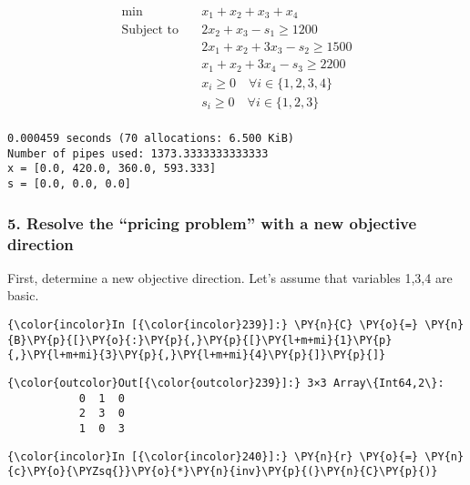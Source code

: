 \begin{equation} \begin{split}\min\quad & x_{1} + x_{2} + x_{3} + x_{4}\\
\text{Subject to} \quad & 2 x_{2} + x_{3} - s_{1} \geq 1200\\
 & 2 x_{1} + x_{2} + 3 x_{3} - s_{2} \geq 1500\\
 & x_{1} + x_{2} + 3 x_{4} - s_{3} \geq 2200\\
 & x_{i} \geq 0 \quad\forall i \in \{1,2,3,4\}\\
 & s_{i} \geq 0 \quad\forall i \in \{1,2,3\}\\
\end{split}
\end{equation}

    
    \begin{Verbatim}[commandchars=\\\{\}]
  0.000459 seconds (70 allocations: 6.500 KiB)
Number of pipes used: 1373.3333333333333
x = [0.0, 420.0, 360.0, 593.333]
s = [0.0, 0.0, 0.0]

    \end{Verbatim}

    \hypertarget{resolve-the-pricing-problem-with-a-new-objective-direction}{%
\subsubsection{5. Resolve the ``pricing problem'' with a new objective
direction}\label{resolve-the-pricing-problem-with-a-new-objective-direction}}

    First, determine a new objective direction. Let's assume that variables
1,3,4 are basic.

    \begin{Verbatim}[commandchars=\\\{\}]
{\color{incolor}In [{\color{incolor}239}]:} \PY{n}{C} \PY{o}{=} \PY{n}{B}\PY{p}{[}\PY{o}{:}\PY{p}{,}\PY{p}{[}\PY{l+m+mi}{1}\PY{p}{,}\PY{l+m+mi}{3}\PY{p}{,}\PY{l+m+mi}{4}\PY{p}{]}\PY{p}{]}
\end{Verbatim}


\begin{Verbatim}[commandchars=\\\{\}]
{\color{outcolor}Out[{\color{outcolor}239}]:} 3×3 Array\{Int64,2\}:
           0  1  0
           2  3  0
           1  0  3
\end{Verbatim}
            
    \begin{Verbatim}[commandchars=\\\{\}]
{\color{incolor}In [{\color{incolor}240}]:} \PY{n}{r} \PY{o}{=} \PY{n}{c}\PY{o}{\PYZsq{}}\PY{o}{*}\PY{n}{inv}\PY{p}{(}\PY{n}{C}\PY{p}{)}
\end{Verbatim}


